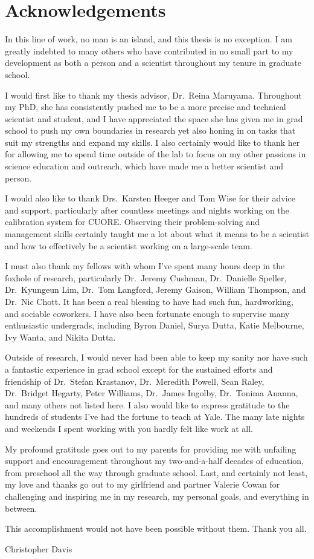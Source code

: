 \chapter*{Acknowledgements}
In this line of work, no man is an island, and this thesis is no exception.
I am greatly indebted to many others who have contributed in no small part to my development as both a person and a scientist throughout my tenure in graduate school.

I would first like to thank my thesis advisor, Dr.\ Reina Maruyama.
Throughout my PhD, she has consistently pushed me to be a more precise and technical scientist and student, and I have appreciated the space she has given me in grad school to push my own boundaries in research yet also honing in on tasks that suit my strengths and expand my skills.
I also certainly would like to thank her for allowing me to spend time outside of the lab to focus on my other passions in science education and outreach, which have made me a better scientist and person.

I would also like to thank Drs.\ Karsten Heeger and Tom Wise for their advice and support, particularly after countless meetings and nights working on the calibration system for CUORE.
Observing their problem-solving and management skills certainly taught me a lot about what it means to be a scientist and how to effectively be a scientist working on a large-scale team.

I must also thank my fellows with whom I've spent many hours deep in the foxhole of research, particularly Dr.\ Jeremy Cushman, Dr.\ Danielle Speller, Dr.\ Kyungeun Lim, Dr.\ Tom Langford, Jeremy Gaison, William Thompson, and Dr.\ Nic Chott. It has been a real blessing to have had such fun, hardworking, and sociable coworkers.
I have also been fortunate enough to supervise many enthusiastic undergrads, including Byron Daniel, Surya Dutta, Katie Melbourne, Ivy Wanta, and Nikita Dutta.

Outside of research, I would never had been able to keep my sanity nor have such a fantastic experience in grad school except for the sustained efforts and friendship of Dr.\ Stefan Krastanov, Dr.\ Meredith Powell, Sean Raley, Dr.\ Bridget Hegarty, Peter Williams, Dr.\ James Ingolby, Dr.\ Tonima Ananna, and many others not listed here.
I also would like to express gratitude to the hundreds of students I've had the fortune to teach at Yale.
The many late nights and weekends I spent working with you hardly felt like work at all.

My profound gratitude goes out to my parents for providing me with unfailing support and encouragement throughout my two-and-a-half decades of education, from preschool all the way through graduate school.
Last, and certainly not least, my love and thanks go out to my girlfriend and partner Valerie Cowan for challenging and inspiring me in my research, my personal goals, and everything in between.

\hfill

This accomplishment would not have been possible without them. Thank you all.

\RaggedRight Christopher Davis
